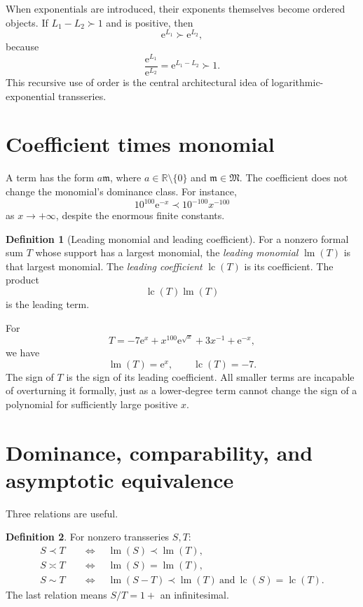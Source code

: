 \documentclass[11pt,openany]{book}
\theoremstyle{definition}
\newtheorem{definition}{Definition}[chapter]
\theoremstyle{plain}
\theoremstyle{remark}
\newcommand{\R}{\mathbb{R}}
\newcommand{\M}{\mathfrak{M}}
\newcommand{\m}{\mathfrak{m}}
\newcommand{\e}{\mathrm{e}}
\newcommand{\asym}{\sim}
\newcommand{\precdom}{\prec}
\newcommand{\succdom}{\succ}
\newcommand{\equivdom}{\asymp}
\DeclareMathOperator{\lm}{lm}
\DeclareMathOperator{\lc}{lc}
\begin{document}
When exponentials are introduced, their exponents themselves become ordered objects. If $L_1-L_2\succdom1$ and is positive, then
\[
 \e^{L_1}\succdom\e^{L_2},
\]
because
\[
 \frac{\e^{L_1}}{\e^{L_2}}=\e^{L_1-L_2}\succdom1.
\]
This recursive use of order is the central architectural idea of logarithmic-exponential transseries.

\section{Coefficient times monomial}

A term has the form $a\m$, where $a\in\R\setminus\{0\}$ and $\m\in\M$. The coefficient does not change the monomial's dominance class. For instance,
\[
 10^{100}\e^{-x}\precdom10^{-100}x^{-100}
\]
as $x\to+\infty$, despite the enormous finite constants.

\begin{definition}[Leading monomial and leading coefficient]
For a nonzero formal sum $T$ whose support has a largest monomial, the \emph{leading monomial} $\lm(T)$ is that largest monomial. The \emph{leading coefficient} $\lc(T)$ is its coefficient. The product
\[
 \lc(T)\lm(T)
\]
is the leading term.
\end{definition}

For
\[
 T=-7\e^{x}+x^{100}\e^{\sqrt{x}}+3x^{-1}+\e^{-x},
\]
we have
\[
 \lm(T)=\e^x,
 \qquad
 \lc(T)=-7.
\]
The sign of $T$ is the sign of its leading coefficient. All smaller terms are incapable of overturning it formally, just as a lower-degree term cannot change the sign of a polynomial for sufficiently large positive $x$.

\section{Dominance, comparability, and asymptotic equivalence}

Three relations are useful.

\begin{definition}
For nonzero transseries $S,T$:
\begin{align*}
 S\precdom T
 &\quad\Longleftrightarrow\quad
 \lm(S)\precdom\lm(T),\\
 S\equivdom T
 &\quad\Longleftrightarrow\quad
 \lm(S)=\lm(T),\\
 S\asym T
 &\quad\Longleftrightarrow\quad
 \lm(S-T)\precdom\lm(T)
 \ \text{and}\ \lc(S)=\lc(T).
\end{align*}
The last relation means $S/T=1+$ an infinitesimal.
\end{definition}
\end{document}

